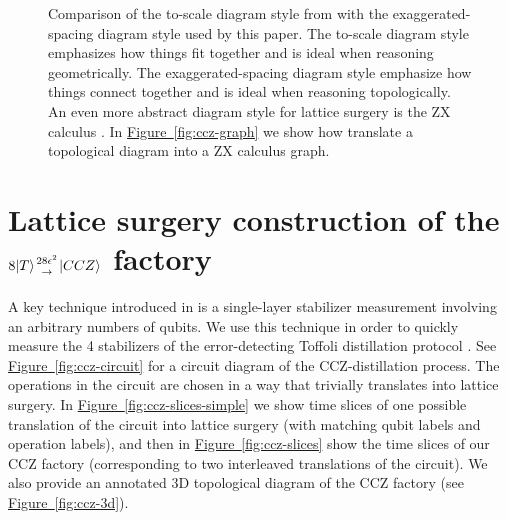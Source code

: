 \documentclass[superscriptaddress,notitlepage,longbibliography]{revtex4-1}
\newcommand{\fig}[1]{\hyperref[fig:#1]{Figure~\ref*{fig:#1}}}
\newcommand{\factory}[3]{$#1 \genfrac{}{}{0pt}{}{#2}{\rightarrow} {#3}$ factory}
\begin{document}
\begin{figure}[ht]
  \label{fig:diagram-style-3d}
  \caption{
    Comparison of the to-scale diagram style from \cite{fowler2018} with the exaggerated-spacing diagram style used by this paper.
    The to-scale diagram style emphasizes how things fit together and is ideal when reasoning geometrically.
    The exaggerated-spacing diagram style emphasize how things connect together and is ideal when reasoning topologically.
    An even more abstract diagram style for lattice surgery is the ZX calculus \cite{de2017}.
    In \fig{ccz-graph} we show how translate a topological diagram into a ZX calculus graph.
  }
\end{figure}




\section{\texorpdfstring{
    Lattice surgery construction of the \factory{8|T\rangle}{28\epsilon^2}{|CCZ\rangle}
}{
    Lattice surgery construction of the 8T to CCZ  factory
}}
\label{sec:ccz}

A key technique introduced in \cite{fowler2018} is a single-layer stabilizer measurement involving an arbitrary numbers of qubits.
We use this technique in order to quickly measure the 4 stabilizers of the error-detecting Toffoli distillation protocol \cite{jones2013, eastin2013distilling}.
See \fig{ccz-circuit} for a circuit diagram of the CCZ-distillation process.
The operations in the circuit are chosen in a way that trivially translates into lattice surgery.
In \fig{ccz-slices-simple} we show time slices of one possible translation of the circuit into lattice surgery (with matching qubit labels and operation labels), and then in \fig{ccz-slices} show the time slices of our CCZ factory (corresponding to two interleaved translations of the circuit).
We also provide an annotated 3D topological diagram of the CCZ factory (see \fig{ccz-3d}).
\end{document}
